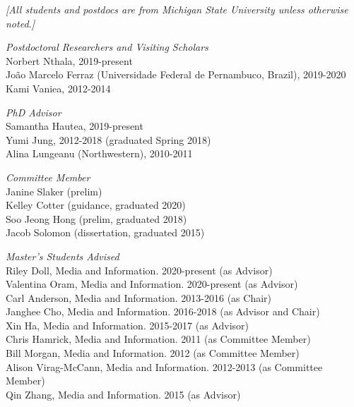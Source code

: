 \documentclass[9pt]{extarticle}
\begin{document}
\vspace{-5pt}
\footnotesize
\emph{[All students and postdocs are from Michigan State University unless otherwise noted.]\\}
\normalsize
\vspace{5pt}

\emph{Postdoctoral Researchers and Visiting Scholars} \\[1pt]
Norbert Nthala, 2019-present \\
Jo\~ao Marcelo Ferraz (Universidade Federal de Pernambuco, Brazil), 2019-2020 \\
Kami Vaniea, 2012-2014

\emph{PhD Advisor} \\[1pt]
Samantha Hautea, 2019-present \\
Yumi Jung, 2012-2018 (graduated Spring 2018) \\
Alina Lungeanu (Northwestern), 2010-2011


\emph{Committee Member} \\[1pt]
Janine Slaker (prelim) \\
Kelley Cotter (guidance, graduated 2020) \\
Soo Jeong Hong (prelim, graduated 2018) \\
Jacob Solomon (dissertation, graduated 2015)

\emph{Master's Students Advised} \\[1pt]
Riley Doll, Media and Information. 2020-present (as Advisor) \\
Valentina Oram, Media and Information. 2020-present (as Advisor) \\
Carl Anderson, Media and Information. 2013-2016 (as Chair) \\
Janghee Cho, Media and Information. 2016-2018 (as Advisor and Chair) \\
Xin Ha, Media and Information. 2015-2017 (as Advisor) \\
Chris Hamrick, Media and Information. 2011 (as Committee Member) \\
Bill Morgan, Media and Information. 2012 (as Committee Member) \\
Alison Virag-McCann, Media and Information. 2012-2013 (as Committee Member) \\
Qin Zhang, Media and Information. 2015 (as Advisor)
\end{document}
